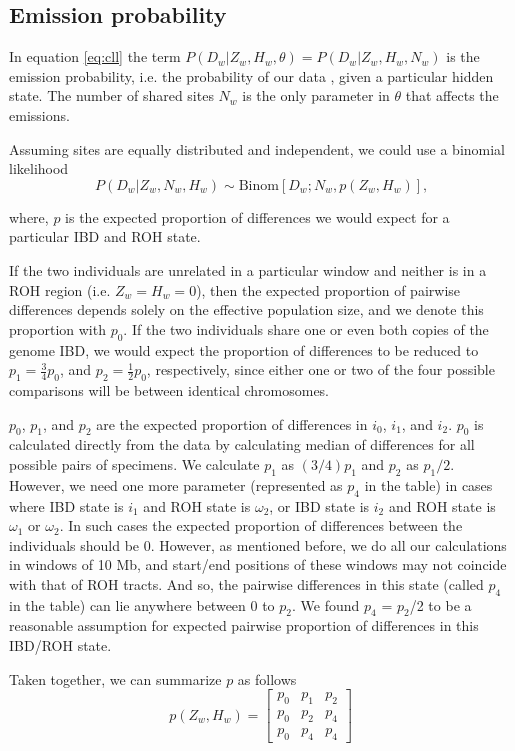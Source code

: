 \documentclass[12pt, letterpaper]{article}
\begin{document}
\subsection{Emission probability}
In equation \ref{eq:cll}  the term $P(D_w | Z_w, H_w, \theta) = P(D_w | Z_w, H_w, N_w)$ is the emission probability, i.e. the probability of our data , given a particular hidden state. The number of shared sites $N_w$ is the only parameter in $\theta$ that affects the emissions.

Assuming sites are equally distributed and independent, we could use a  binomial likelihood
$$P(D_w|Z_w, N_w, H_w) \sim \text{Binom}[D_w ;N_w, p(Z_w, H_w)] \text{,}$$

where, $p$  is the expected proportion of differences we would expect for a particular IBD and ROH state.

If the two individuals are unrelated in a particular window and neither is in a ROH region (i.e. $Z_w = H_w = 0$), then the expected proportion of pairwise differences depends solely on the effective population size, and we denote this proportion with $p_0$. If the two individuals share one or even both copies of the genome IBD, we would expect the proportion of differences to be reduced to $p_1 = \frac{3}{4} p_0$, and $p_2 = \frac{1}2 p_0$, respectively, since either one or two of the four possible comparisons will be between identical chromosomes.


$p_0$, $p_1$, and $p_2$ are the expected proportion of differences in $i_0$, $i_1$, and $i_2$. $p_0$ is calculated directly from the data by calculating median of differences for all possible pairs of specimens. We calculate $p_1$ as $(3/4)p_1$ and $p_2$ as $p_1/2$. However, we need one more parameter (represented as $p_4$ in the table) in cases where IBD state is $i_1$ and ROH state is $\omega_2$, or IBD state is $i_2$ and ROH state is $\omega_1$ or $\omega_2$. In such cases the expected proportion of differences between the individuals should be 0. However, as mentioned before, we do all our calculations in windows of 10 Mb, and start/end positions of these windows may not coincide with that of ROH tracts. And so, the pairwise differences in this state (called $p_4$ in the table) can lie anywhere between 0 to $p_2$. We found $p_4$ = $p_2$/2 to be a reasonable assumption for expected pairwise proportion of differences in this IBD/ROH state.


Taken together, we can summarize $p$ as follows 
\begin{equation}\label{eq:p}
    p(Z_w, H_w) = \left[\begin{array}
{rrr}
p_0 & p_1 & p_2 \\
p_0 & p_2 & p_4 \\
p_0 & p_4 & p_4
\end{array}\right]
\end{equation}
\end{document}
